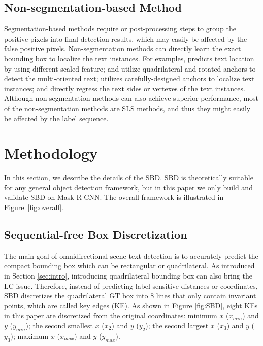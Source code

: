 \documentclass{article}
\begin{document}
\subsection{Non-segmentation-based Method} 
Segmentation-based methods require or post-processing steps to group the positive pixels into final detection results, which may easily be affected by the false positive pixels. Non-segmentation methods can directly learn the exact bounding box to localize the text instances. For examples, \cite{liao2018rotation} predicts text location by using different scaled feature; \cite{liu2017deep} and \cite{ma2018arbitrary} utilize quadrilateral and rotated anchors to detect the multi-oriented text; \cite{liao2018textboxes++} utilizes carefully-designed anchors to localize text instances; \cite{zhou2017east} and \cite{he2017deep} directly regress the text sides or vertexes of the text instances. Although non-segmentation methods can also achieve superior performance, most of the non-segmentation methods are SLS methods, and thus they might easily be affected by the label sequence.

\section{Methodology}
In this section, we describe the details of the SBD. SBD is theoretically suitable for any general object detection framework, but in this paper we only build and validate SBD on Mask R-CNN. The overall framework is illustrated in Figure~\ref{fig:overall}. 



\subsection{Sequential-free Box Discretization}
The main goal of omnidirectional scene text detection is to accurately predict the compact bounding box which can be rectangular or quadrilateral. As introduced in Section \ref{sec:intro}, introducing quadrilateral bounding box can also bring the LC issue. Therefore, instead of predicting label-sensitive distances or coordinates, SBD discretizes the quadrilateral GT box into 8 lines that only contain invariant points, which are called key edges (KE). As shown in Figure \ref{fig:SBD}, eight KEs in this paper are discretized from the original coordinates: minimum $x$ ($x_{min}$) and $y$ ($y_{min}$); the second smallest $x$ ($x_2$) and $y$ ($y_2$); the second largest $x$ ($x_3$) and $y$ ($y_3$); maximum $x$ ($x_{max}$) and $y$ ($y_{max}$). 
\end{document}

